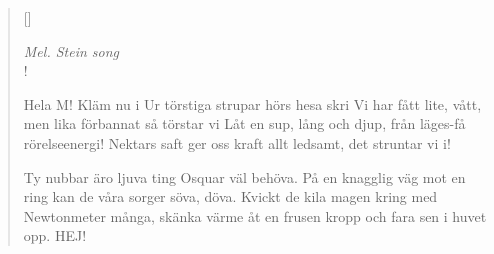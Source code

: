 
\settowidth{\versewidth}{Hela M}



\begin{verse}[\versewidth]


\flagverse{}
\emph{Mel. Stein song}\\!



Hela M!\*
Kläm nu i\*
Ur törstiga strupar hörs hesa skri\*
Vi har fått\*
lite, vått,\*
men lika förbannat så törstar vi\*
Låt en sup,\*
lång och djup,\*
från läges-få rörelseenergi!\*
Nektars saft\*
ger oss kraft\*
allt ledsamt, det struntar vi i!\!

Ty nubbar äro ljuva ting\*
Osquar väl behöva.\*
På en knagglig väg mot en ring\*
kan de våra sorger söva, döva.\*
Kvickt de kila magen kring\*
med Newtonmeter många,\*
skänka värme åt en frusen kropp\*
och fara sen i huvet opp.\*
HEJ!\!


\end{verse}

